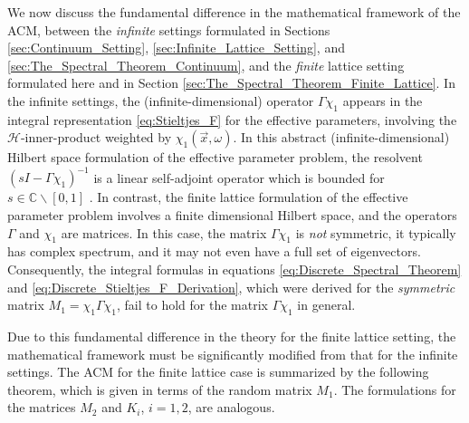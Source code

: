 \documentclass{cmslatex}
\begin{document}
We now discuss the fundamental difference in the mathematical
framework of the ACM, between the \emph{infinite}
settings formulated in Sections \ref{sec:Continuum_Setting},
\ref{sec:Infinite_Lattice_Setting}, and
\ref{sec:The_Spectral_Theorem_Continuum}, and the \emph{finite}
lattice setting formulated here and in Section
\ref{sec:The_Spectral_Theorem_Finite_Lattice}. In the infinite
settings, the (infinite-dimensional) operator $\Gamma\chi_1$ appears in the integral
representation \eqref{eq:Stieltjes_F} for the effective parameters,
involving the $\mathscr{H}$-inner-product 
weighted by $\chi_1(\vec{x},\omega)$. In this abstract (infinite-dimensional)
Hilbert space formulation of the effective parameter problem, the
resolvent $(sI-\Gamma\chi_1)^{-1}$ is a linear self-adjoint operator which is
bounded for $s\in\mathbb{C}\backslash[0,1]$ \cite{Stone:64}. In contrast, the
finite lattice formulation of the effective parameter problem involves
a finite dimensional Hilbert space, and the operators $\Gamma$ and $\chi_1$
are matrices. In this case, the matrix $\Gamma\chi_1$ is \emph{not} symmetric,
it typically has complex spectrum, and it may not even have a full set
of eigenvectors. Consequently, the integral formulas in equations
\eqref{eq:Discrete_Spectral_Theorem} and
\eqref{eq:Discrete_Stieltjes_F_Derivation}, which were derived for the 
\emph{symmetric} matrix $M_1=\chi_1\Gamma\chi_1$, fail to hold for the matrix
$\Gamma\chi_1$ in general.



Due to this fundamental difference in the theory
for the finite lattice setting, the mathematical framework must be 
significantly modified from that for the infinite settings. The ACM
for the finite lattice case is summarized by the following theorem,
which is given in terms of the random matrix $M_1$. The formulations
for the matrices $M_2$ and $K_i$, $i=1,2$, are analogous.
\end{document}
